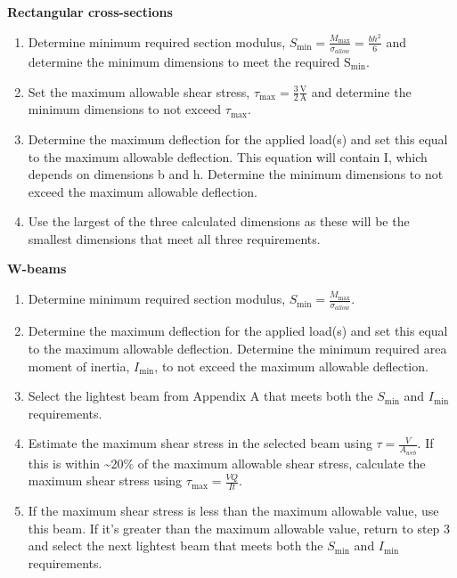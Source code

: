 \documentclass[
  letterpaper,
  DIV=11,
  numbers=noendperiod]{scrreprt}
\theoremstyle{definition}
\theoremstyle{remark}
\begin{document}
\begin{tcolorbox}[enhanced jigsaw, leftrule=.75mm, colbacktitle=quarto-callout-warning-color!10!white, breakable, opacityback=0, colback=white, titlerule=0mm, toprule=.15mm, colframe=quarto-callout-warning-color-frame, coltitle=black, title={Step-by-step: Intermediate Beam Design}, toptitle=1mm, bottomrule=.15mm, rightrule=.15mm, left=2mm, arc=.35mm, opacitybacktitle=0.6, bottomtitle=1mm]

\textbf{Rectangular cross-sections}

\begin{enumerate}
\def\labelenumi{\arabic{enumi}.}
\item
  Determine minimum required section modulus,
  \(S_{\min }=\frac{M_{\max }}{\sigma_{allow}}=\frac{b h^{2}}{6}\) and
  determine the minimum dimensions to meet the required
  \(\mathrm{S}_{\mathrm{min}}\).
\item
  Set the maximum allowable shear stress,
  \(\tau_{\max }=\frac{3}{2} \frac{\mathrm{V}}{\mathrm{A}}\) and
  determine the minimum dimensions to not exceed \(\tau_{\max }\).
\item
  Determine the maximum deflection for the applied load(s) and set this
  equal to the maximum allowable deflection. This equation will contain
  I, which depends on dimensions b and h. Determine the minimum
  dimensions to not exceed the maximum allowable deflection.
\item
  Use the largest of the three calculated dimensions as these will be
  the smallest dimensions that meet all three requirements.
\end{enumerate}

\textbf{W-beams}

\begin{enumerate}
\def\labelenumi{\arabic{enumi}.}
\item
  Determine minimum required section modulus,
  \(S_{\min }=\frac{M_{\max }}{\sigma_{allow}}\).
\item
  Determine the maximum deflection for the applied load(s) and set this
  equal to the maximum allowable deflection. Determine the minimum
  required area moment of inertia, \(I_{\min }\), to not exceed the
  maximum allowable deflection.
\item
  Select the lightest beam from Appendix A that meets both the
  \(S_{\min }\) and \(I_{\min }\) requirements.
\item
  Estimate the maximum shear stress in the selected beam using
  \(\tau=\frac{V}{A_{w e b}}\). If this is within \textasciitilde20\% of
  the maximum allowable shear stress, calculate the maximum shear stress
  using \(\tau_{\max }=\frac{V Q}{I t}\).
\item
  If the maximum shear stress is less than the maximum allowable value,
  use this beam. If it's greater than the maximum allowable value,
  return to step 3 and select the next lightest beam that meets both the
  \(S_{\min }\) and \(I_{\min }\) requirements.
\end{enumerate}

\end{tcolorbox}
\end{document}
